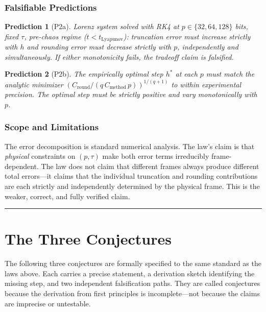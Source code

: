 \documentclass[12pt]{article}
\theoremstyle{lawstyle}
\theoremstyle{conjstyle}
\theoremstyle{predstyle}
\newtheorem{prediction}{Prediction}
\begin{document}
\subsubsection*{Falsifiable Predictions}

\begin{prediction}[P2a]
Lorenz system solved with RK4 at $p \in \{32, 64, 128\}$ bits, fixed $\tau$, pre-chaos
regime ($t < t_{\mathrm{Lyapunov}}$): truncation error must increase strictly with $h$
and rounding error must decrease strictly with $p$, independently and simultaneously.
If either monotonicity fails, the tradeoff claim is falsified.
\end{prediction}

\begin{prediction}[P2b]
The empirically optimal step $h^*$ at each $p$ must match the analytic minimizer
$(C_{\mathrm{round}} / (q\, C_{\mathrm{method}}\, p))^{1/(q+1)}$ to within experimental
precision. The optimal step must be strictly positive and vary monotonically with $p$.
\end{prediction}

\subsubsection*{Scope and Limitations}

The error decomposition is standard numerical analysis. The law's claim is that \emph{physical}
constraints on $(p, \tau)$ make both error terms irreducibly frame-dependent. The law does not
claim that different frames always produce different total errors---it claims that the individual
truncation and rounding contributions are each strictly and independently determined by the
physical frame. This is the weaker, correct, and fully verified claim.

\bigskip
\hrule
\bigskip

\section{The Three Conjectures}

The following three conjectures are formally specified to the same standard as the laws
above. Each carries a precise statement, a derivation sketch identifying the missing step,
and two independent falsification paths. They are called conjectures because the derivation
from first principles is incomplete---not because the claims are imprecise or untestable.
\end{document}
